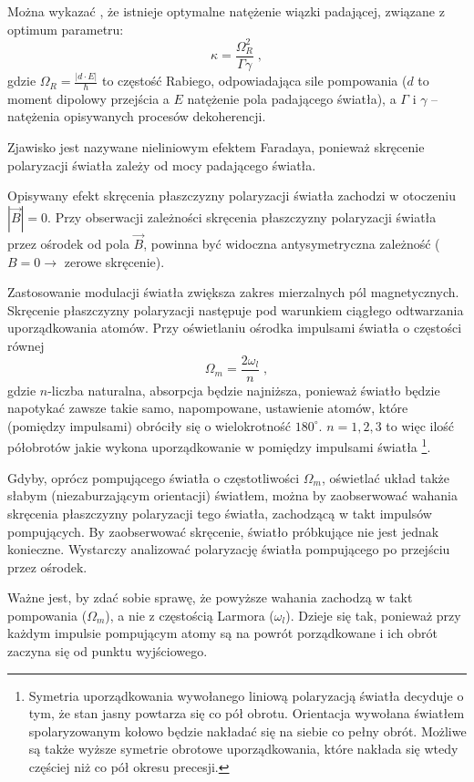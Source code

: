 \documentclass[a4paper,10pt,twoside]{report}
\begin{document}
Można wykazać \cite{srivansan}, że istnieje optymalne natężenie wiązki padającej, związane z optimum parametru:
\begin{equation}
\kappa=\frac{\Omega_R^2}{\Gamma\gamma} \; ,
\end{equation}
gdzie $\Omega_R=\frac{|d \cdot E|}{\hbar}$ to częstość Rabiego, odpowiadająca sile pompowania ($d$ to moment dipolowy przejścia a $E$ natężenie pola padającego światła), a $\Gamma$ i $\gamma$ -- natężenia opisywanych procesów dekoherencji.

Zjawisko jest nazywane nieliniowym efektem Faradaya, ponieważ skręcenie polaryzacji światła zależy od mocy padającego światła.

Opisywany efekt skręcenia płaszczyzny polaryzacji światła zachodzi w otoczeniu $|\vec B|=0$. Przy obserwacji zależności skręcenia płaszczyzny polaryzacji światła przez ośrodek od pola $\vec B$, powinna być widoczna antysymetryczna zależność ($B=0\rightarrow$ zerowe skręcenie).

 Zastosowanie modulacji światła zwiększa zakres mierzalnych pól magnetycznych. Skręcenie płaszczyzny polaryzacji następuje pod warunkiem ciągłego odtwarzania uporządkowania atomów. Przy oświetlaniu ośrodka impulsami światła o częstości równej
\begin{equation}
\Omega_m=\frac{2 \omega_l}{n} \; ,
\end{equation}
gdzie $n$-liczba naturalna, absorpcja będzie najniższa, ponieważ światło będzie napotykać zawsze takie samo, napompowane, ustawienie atomów, które (pomiędzy impulsami) obróciły się o wielokrotność $180^{\circ}$.  $n=1,2,3$ to więc ilość półobrotów jakie wykona uporządkowanie w pomiędzy impulsami światła \footnote{Symetria uporządkowania wywołanego liniową polaryzacją światła decyduje o tym, że stan jasny powtarza się co pół obrotu. Orientacja wywołana światłem spolaryzowanym kołowo będzie nakładać się na siebie co pełny obrót. Możliwe są także wyższe symetrie obrotowe uporządkowania, które nakłada się wtedy częściej niż co pół okresu precesji.}.

Gdyby, oprócz pompującego światła o częstotliwości $\Omega_m$, oświetlać układ także słabym (niezaburzającym orientacji) światłem, można by zaobserwować wahania skręcenia płaszczyzny polaryzacji tego światła, zachodzącą w takt impulsów pompujących.
By zaobserwować skręcenie, światło próbkujące nie jest jednak konieczne. Wystarczy analizować polaryzację światła pompującego po przejściu przez ośrodek.


Ważne jest, by zdać sobie sprawę, że powyższe wahania zachodzą w takt pompowania ($\Omega_m$), a nie z częstością Larmora ($\omega_l$). Dzieje się tak, ponieważ przy każdym impulsie pompującym atomy są na powrót porządkowane i ich obrót zaczyna się od punktu wyjściowego.
\end{document}
